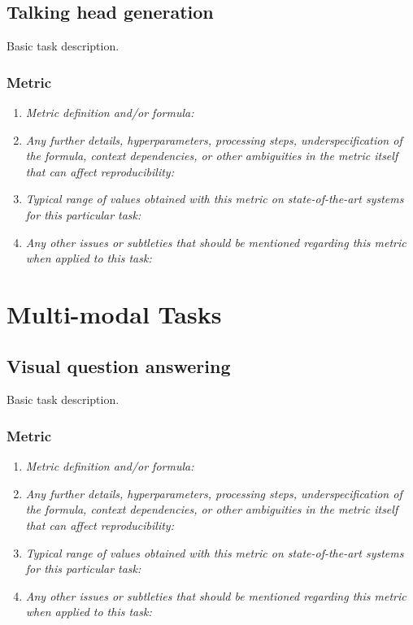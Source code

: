 \documentclass[a4paper,11pt]{article}
\begin{document}
\subsection{Talking head generation}
    Basic task description.
    \subsubsection{Metric}
        \begin{enumerate}[label=\alph*.]
            \item \textit{Metric definition and/or formula:}
            \bigskip
            \item \textit{Any further details, hyperparameters, processing steps, underspecification of the formula, context dependencies, or other ambiguities in the metric itself that can affect reproducibility:}
            \bigskip
            \item \textit{Typical range of values obtained with this metric on state-of-the-art systems for this particular task:}
            \bigskip
            \item \textit{Any other issues or subtleties that should be mentioned regarding this metric when applied to this task:}
            \bigskip
        \end{enumerate}

\section{Multi-modal Tasks}
\subsection{Visual question answering}
    Basic task description.
    \subsubsection{Metric}
        \begin{enumerate}[label=\alph*.]
            \item \textit{Metric definition and/or formula:}
            \bigskip
            \item \textit{Any further details, hyperparameters, processing steps, underspecification of the formula, context dependencies, or other ambiguities in the metric itself that can affect reproducibility:}
            \bigskip
            \item \textit{Typical range of values obtained with this metric on state-of-the-art systems for this particular task:}
            \bigskip
            \item \textit{Any other issues or subtleties that should be mentioned regarding this metric when applied to this task:}
            \bigskip
        \end{enumerate}
\end{document}

